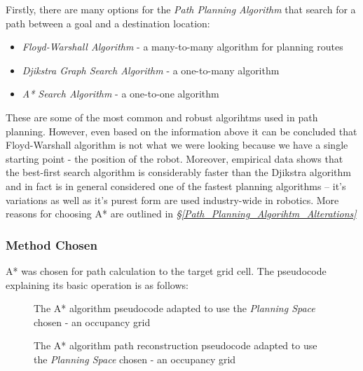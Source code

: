\documentclass[11pt, a4paper]{article}
\begin{document}
Firstly, there are many options for the \textit{Path Planning Algorithm} that search for a path between a goal and a destination location:

\begin{itemize}

	\item \textit{Floyd-Warshall Algorithm} \cite{path_warshall} - a many-to-many algorithm for planning routes
	\item \textit{Djikstra Graph Search Algorithm} \cite{path_djikstra} - a one-to-many algorithm
	\item \textit{A* Search Algorithm} \cite{path_astar}	- a one-to-one algorithm

\end{itemize}

These are some of the most common and robust algorihtms used in path planning. However, even based on 
the information above it can be concluded that Floyd-Warshall algorithm is not what we were looking 
because we have a single starting point - the position of the robot. Moreover, empirical data 
\cite{path_efficiency} shows that the best-first search algorithm is considerably faster than 
the Djikstra algorithm and in fact is in general considered one of the fastest planning algorithms -- 
it's variations as well as it's purest form are used industry-wide in robotics. 
More reasons for choosing A* are outlined in \textit{\S\ref{Path_Planning_Algorihtm_Alterations}}

\subsubsection{Method Chosen} 

A* was chosen for path calculation to the target grid cell. The pseudocode explaining its basic operation is as follows:

\begin{figure}[H]
	  \centering 
	  \caption{The A* algorithm pseudocode\cite{path_astar_pseudocode} adapted to use the \textit{Planning Space} chosen - an occupancy grid }
\end{figure} 


\begin{figure}[H]
 	  \centering
          \caption{The A* algorithm path reconstruction pseudocode\cite{path_astar_grid_no_grid} adapted to use the \textit{Planning Space} chosen - an occupancy grid }
\end{figure} 
\end{document}
